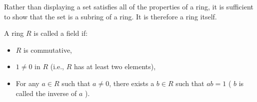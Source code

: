\begin{method}
  Rather than displaying a set satisfies all of the properties of a ring, it is   sufficient to show that the set is a subring of a ring. It is therefore a ring itself.
\end{method}

\begin{definition}[Field]

A ring $R$ is called a field if:
\begin{itemize}
\item[i)] $R$ is commutative,
\item[ii)] $1 \neq 0$ in $R$ (i.e., $R$ has at least two elements),
\item[iii)] For any $a \in R$ such that $a \neq 0$, there exists a $b \in R$ such that $a b=1$ ( $b$ is called the inverse of $a$ ).
\end{itemize}

\end{definition}

